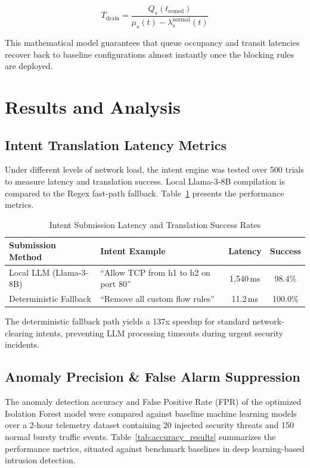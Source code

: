 \documentclass[conference]{IEEEtran}
\begin{document}
\begin{equation}
T_{\text{drain}} = \frac{Q_s(t_{\text{remed}})}{\mu_s(t) - \lambda_s^{\text{normal}}(t)}
\end{equation}

This mathematical model guarantees that queue occupancy and transit latencies recover back to baseline configurations almost instantly once the blocking rules are deployed.

\section{Results and Analysis}



\subsection{Intent Translation Latency Metrics}
Under different levels of network load, the intent engine was tested over 500 trials to measure latency and translation success. Local Llama-3-8B compilation is compared to the Regex fast-path fallback. Table~\ref{tab:latency_results} presents the performance metrics.

\begin{table}[htbp]
\caption{Intent Submission Latency and Translation Success Rates}
\label{tab:latency_results}
\centering
\small
\begin{tabularx}{\linewidth}{XXcc}
\toprule
\textbf{Submission Method} & \textbf{Intent Example} & \textbf{Latency} & \textbf{Success} \\
\midrule
Local LLM (Llama-3-8B) & ``Allow TCP from h1 to h2 on port 80'' & 1,540\,ms & 98.4\% \\
\midrule
Deterministic Fallback & ``Remove all custom flow rules'' & 11.2\,ms & 100.0\% \\
\bottomrule
\end{tabularx}
\end{table}

The deterministic fallback path yields a 137x speedup for standard network-clearing intents, preventing LLM processing timeouts during urgent security incidents.

\subsection{Anomaly Precision \& False Alarm Suppression}
The anomaly detection accuracy and False Positive Rate (FPR) of the optimized Isolation Forest model were compared against baseline machine learning models over a 2-hour telemetry dataset containing 20 injected security threats and 150 normal bursty traffic events. Table~\ref{tab:accuracy_results} summarizes the performance metrics, situated against benchmark baselines in deep learning-based intrusion detection.
\end{document}
